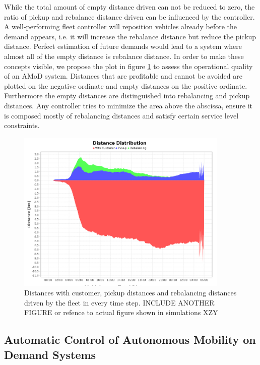 While the total amount of empty distance driven can not be reduced to zero, the ratio of pickup and rebalance distance driven can be influenced by the controller. A well-performing fleet controller will reposition vehicles already before the demand appears, i.e. it will increase the rebalance distance but reduce the pickup distance. Perfect estimation of future demands would lead to a system where almost all of the empty distance is rebalance distance. In order to make these concepts visible, we propose the plot in figure \ref{fig:study_area_vnodes} to assess the operational quality of an AMoD system. Distances that are profitable and cannot be avoided are plotted on the negative ordinate and empty distances on the positive ordinate. Furthermore the empty distances are distinguished into rebalancing and pickup distances. Any controller tries to minimize the area above the abscissa, ensure it is composed mostly of rebalancing distances and satisfy certain service level constraints.



\begin{figure}[h]
\begin{center}\includegraphics[width=0.9\textwidth]{figures/distancePlot.png}\end{center}
\caption{Distances with customer, pickup distances and rebalancing distances driven by the fleet in every time step. INCLUDE ANOTHER FIGURE or refence to actual figure shown in simulations XZY}
\label{fig:study_area_vnodes}
\end{figure}




\subsection{Automatic Control of Autonomous Mobility on Demand Systems}
\label{subsec:automaticControl}

